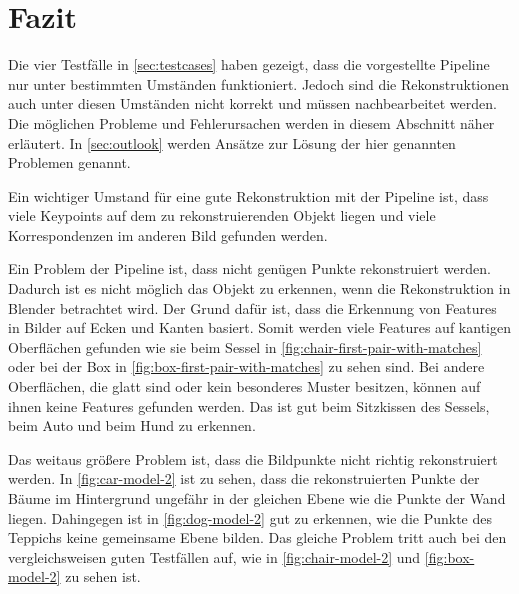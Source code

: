 \chapter{Fazit}
\label{sec:conclusion}

Die vier Testfälle in \cref{sec:testcases} haben gezeigt, dass die vorgestellte Pipeline nur unter bestimmten Umständen funktioniert.
Jedoch sind die Rekonstruktionen auch unter diesen Umständen nicht korrekt und müssen nachbearbeitet werden.
Die möglichen Probleme und Fehlerursachen werden in diesem Abschnitt näher erläutert.
In \cref{sec:outlook}  werden Ansätze zur Lösung der hier genannten Problemen genannt.

Ein wichtiger Umstand für eine gute Rekonstruktion mit der Pipeline ist, dass viele Keypoints auf dem zu rekonstruierenden Objekt liegen und viele Korrespondenzen im anderen Bild gefunden werden.

Ein Problem der Pipeline ist, dass nicht genügen Punkte rekonstruiert werden.
Dadurch ist es nicht möglich das Objekt zu erkennen, wenn die Rekonstruktion in Blender betrachtet wird.
Der Grund dafür ist, dass die Erkennung von Features in Bilder auf Ecken und Kanten basiert.
Somit werden viele Features auf kantigen Oberflächen gefunden wie sie beim Sessel in \cref{fig:chair-first-pair-with-matches} oder bei der Box in \cref{fig:box-first-pair-with-matches} zu sehen sind.
Bei andere Oberflächen, die glatt sind oder kein besonderes Muster besitzen, können auf ihnen keine Features gefunden werden.
Das ist gut beim Sitzkissen des Sessels, beim Auto und beim Hund zu erkennen. 

Das weitaus größere Problem ist, dass die Bildpunkte nicht richtig rekonstruiert werden.
In \cref{fig:car-model-2} ist zu sehen, dass die rekonstruierten Punkte der Bäume im Hintergrund ungefähr in der gleichen Ebene wie die Punkte der Wand liegen.  
Dahingegen ist in \cref{fig:dog-model-2} gut zu erkennen, wie die Punkte des Teppichs keine gemeinsame Ebene bilden.
Das gleiche Problem tritt auch bei den vergleichsweisen guten Testfällen auf, wie in \cref{fig:chair-model-2} und \cref{fig:box-model-2} zu sehen ist.

